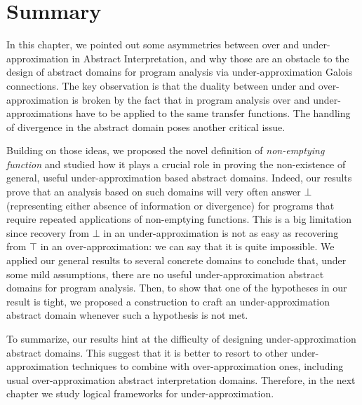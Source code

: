 \section{Summary}
In this chapter, we pointed out some asymmetries between over and under-approximation in Abstract Interpretation, and why those are an obstacle to the design of abstract domains for program analysis via under-approximation Galois connections. The key observation is that the duality between under and over-approximation is broken by the fact that in program analysis over and under-approximations have to be applied to the same transfer functions. The handling of divergence in the abstract domain poses another critical issue.

Building on those ideas, we proposed the novel definition of \emph{non-emptying function} and studied how it plays a crucial role in proving the non-existence of general, useful under-approximation based abstract domains. Indeed, our results prove that an analysis based on such domains will very often answer $\bot$ (representing either absence of information or divergence) for programs that require repeated applications of non-emptying functions. This is a big limitation since recovery from $\bot$ in an under-approximation is not as easy as recovering from $\top$ in an over-approximation: we can say that it is quite impossible.
We applied our general results to several concrete domains to conclude that, under some mild assumptions, there are no useful under-approximation abstract domains for program analysis. Then, to show that one of the hypotheses in our result is tight, we proposed a construction to craft an under-approximation abstract domain whenever such a hypothesis is not met.

To summarize, our results hint at the difficulty of designing under-approximation abstract domains. This suggest that it is better to resort to other under-approximation techniques to combine with over-approximation ones, including usual over-approximation abstract interpretation domains. Therefore, in the next chapter we study logical frameworks for under-approximation.
